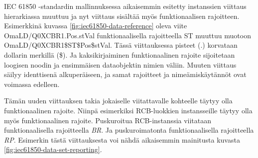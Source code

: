 IEC 61850 -standardin mallinnuksessa aikaisemmin esitetty instanssien viittaus hierarkiassa muuttuu ja nyt viittaus sisältää myös funktionaalisen rajoitteen. Esimerkkinä kuvassa \ref{fig:iec61850-data-reference} oleva viite OmaLD/Q0XCBR1.Pos.stVal funktionaalisella rajoitteella ST muuttuu muotoon OmaLD/Q0XCBR1\$ST\$Pos\$stVal. Tässä viittauksessa pisteet (.) korvataan dollarin merkillä (\$). Ja kaksikirjaiminen funktionaalinen rajoite sijoitetaan loogisen noodin ja ensimmäisen dataobjektin nimien väliin. Muuten viittaus säilyy identtisenä alkuperäiseen, ja samat rajoitteet ja nimeämiskäytännöt ovat voimassa edelleen. \mbox{\cite[s.~34--35, 111]{IEC61850-8-1}}

Tämän uuden viittauksen takia jokaiselle viitattavalle kohteelle täytyy olla funktionaalinen rajoite. Niinpä esimerkiksi RCB-luokkien instansseille täytyy olla myös funktionaalinen rajoite. Puskuroitua RCB-instanssia viitataan funktionaalisella rajoitteella \emph{BR}. Ja puskuroimatonta funktionaalisella rajoitteella \emph{RP}. Esimerkin tästä viittauksesta voi nähdä aikaisemmin mainitusta kuvasta \ref{fig:iec61850-data-set-reporting}. \mbox{\cite[s.~32--34, 75]{IEC61850-8-1}}
